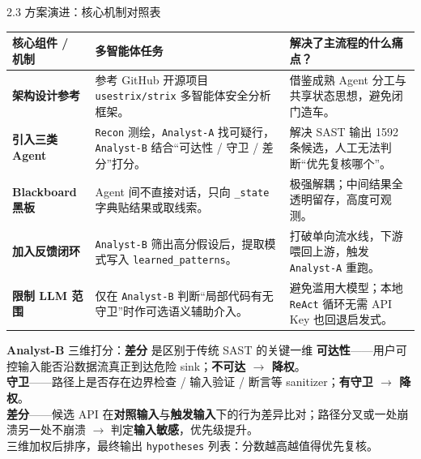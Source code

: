 \documentclass[11pt,aspectratio=169]{beamer}
\newcommand{\hl}[1]{\textcolor{red!72!black}{\textbf{#1}}}
\newcommand{\hlb}[1]{\textcolor{accentblue}{\textbf{#1}}}
\begin{document}
\begin{frame}{2.3 \quad 方案演进：核心机制对照表}
  \scriptsize
  \renewcommand{\arraystretch}{1.22}
  \hspace*{-0.3cm}\begin{tabular}{p{2.3cm}p{5.3cm}p{5.7cm}}
    \toprule
    \textbf{核心组件 / 机制} & \textbf{多智能体任务} & \textbf{解决了主流程的什么痛点？} \\
    \midrule
    \textbf{架构设计参考} & 参考 GitHub 开源项目 \texttt{usestrix/strix} 多智能体安全分析框架。 & 借鉴成熟 Agent 分工与共享状态思想，避免闭门造车。 \\
    \textbf{引入三类 Agent} & \texttt{Recon} 测绘，\texttt{Analyst-A} 找可疑行，\texttt{Analyst-B} 结合``可达性 / 守卫 / 差分''打分。 & 解决 SAST 输出 1592 条候选，人工无法判断``优先复核哪个''。 \\
    \textbf{Blackboard 黑板} & Agent 间不直接对话，只向 \texttt{\_state} 字典贴结果或取线索。 & 极强解耦；中间结果全透明留存，高度可观测。 \\
    \textbf{加入反馈闭环} & \texttt{Analyst-B} 筛出高分假设后，提取模式写入 \texttt{learned\_patterns}。 & 打破单向流水线，下游喂回上游，触发 \texttt{Analyst-A} 重跑。 \\
    \textbf{限制 LLM 范围} & 仅在 \texttt{Analyst-B} 判断``局部代码有无守卫''时作可选语义辅助介入。 & 避免滥用大模型；本地 \texttt{ReAct} 循环无需 API Key 也回退启发式。 \\
    \bottomrule
  \end{tabular}

  \vspace{0.25cm}
  \begin{block}{\hlb{Analyst-B} 三维打分：\hl{差分} 是区别于传统 SAST 的关键一维}
    \scriptsize
    \hlb{可达性}——用户可控输入能否沿数据流真正到达危险 sink；\hlb{不可达 $\rightarrow$ 降权}。\\[1pt]
    \hlb{守卫}——路径上是否存在边界检查 / 输入验证 / 断言等 sanitizer；\hlb{有守卫 $\rightarrow$ 降权}。\\[1pt]
    \hlb{差分}——候选 API 在\hl{对照输入}与\hl{触发输入}下的行为差异比对；路径分叉或一处崩溃另一处不崩溃 $\rightarrow$ 判定\hl{输入敏感}，优先级提升。\\[2pt]
    {\tiny 三维加权后排序，最终输出 \texttt{hypotheses} 列表：分数越高越值得优先复核。}
  \end{block}
\end{frame}
\end{document}
